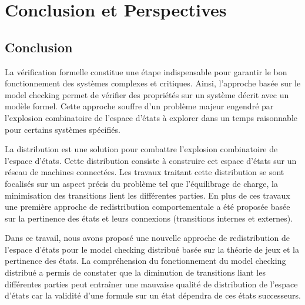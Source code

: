
\chapter*{Conclusion et Perspectives}

\section*{Conclusion}
La vérification formelle constitue une étape indispensable pour garantir le bon fonctionnement des systèmes complexes et critiques. Ainsi, l’approche basée sur le model checking permet de vérifier des propriétés sur un système décrit avec un modèle formel. Cette approche souffre d'un problème majeur engendré par l'explosion combinatoire de l'espace d'états à explorer  dans un temps raisonnable pour certains systèmes spécifiés.

La distribution est une solution pour combattre l'explosion combinatoire de l'espace d'états. Cette distribution consiste à construire cet espace d'états sur un réseau de machines connectées. Les travaux traitant cette distribution se sont focalisés sur un aspect précis du problème tel que l’équilibrage de charge, la minimisation des transitions lient les différentes parties. En plus de ces travaux une première approche de redistribution comportementale a été proposée basée sur la pertinence des états et leurs connexions (transitions internes et externes).

Dans ce travail, nous avons proposé une nouvelle approche de redistribution de l'espace d'états pour le model checking distribué basée sur la théorie de jeux et la pertinence des états. La compréhension du fonctionnement du model checking distribué a permis de constater que la diminution de transitions liant les différentes parties peut entraîner une mauvaise qualité de distribution de l'espace d'états car la validité d'une formule sur un état dépendra de ces états successeurs.

